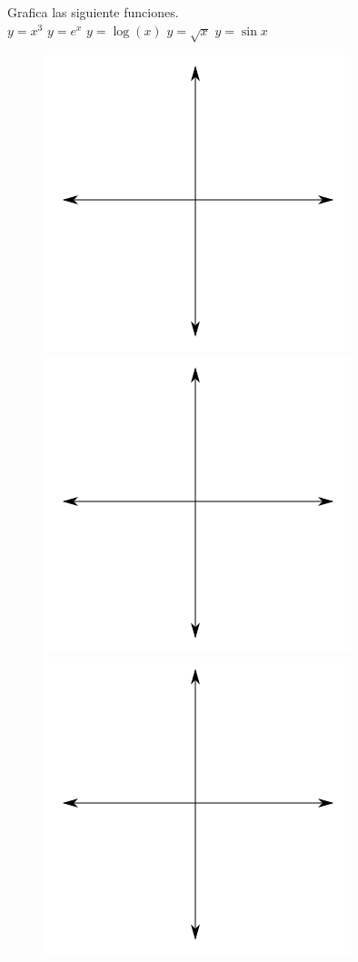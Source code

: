 \documentclass[a4paper,10pt]{article}
\begin{document}
\pagebreak
Grafica las siguiente funciones.\\
$y=x^3$\hspace{1.3cm} $y=e^x$\hspace{1.3cm} $y=\log(x)$\hspace{1.3cm} $y=\sqrt{x}$\hspace{1.3cm} $y=\sin{x}$

\begin{figure}[H]
\includegraphics[scale=0.5]{plot.png}
\includegraphics[scale=0.5]{plot.png}
\includegraphics[scale=0.5]{plot.png}

\end{figure}
\end{document}
